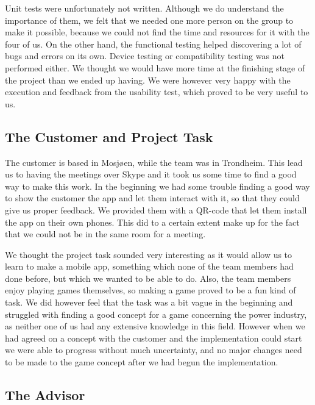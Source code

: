 	Unit tests were unfortunately not written. Although we do understand the importance of them, 
	we felt that we needed one more person on the group to make it possible, because we could not 
	find the time and resources for it with the four of us. On the other hand, the functional
	testing helped discovering a lot of bugs and errors on its own.  
	Device testing or compatibility testing was not performed either. We thought we would have more 
	time at the finishing stage of the project than we ended up having.
	We were however very happy with the execution and feedback from the usability test, which proved 
	to be very useful to us.


\subsection{The Customer and Project Task}


	The customer is based in Mosjøen, while the team was in Trondheim. This lead us to having the 
	meetings over Skype and it took us some time to find a good way to make this work. In the beginning 
	we had some trouble finding a good way to show the customer the app and let them interact with it, 
	so that they could give us proper feedback. We provided them with a QR-code that let them install 
	the app on their own phones. This did to a certain extent make up for the fact that we could not 
	be in the same room for a meeting.

	We thought the project task sounded very interesting as it would allow us to learn to make a mobile app, 
	something which none of the team members had done before, but which we wanted to be able to do. Also, 
	the team members enjoy playing games themselves, so making a game proved to be a fun kind of task. 
	We did however feel that the task was a bit vague in the beginning and struggled with finding a good 
	concept for a game concerning the power industry, as neither one of us had any extensive knowledge 
	in this field. However when we had agreed on a concept with the customer and the implementation could 
	start we were able to progress without much uncertainty, and no major changes need to be made to the
	game concept after we had begun the implementation.


\subsection{The Advisor}

